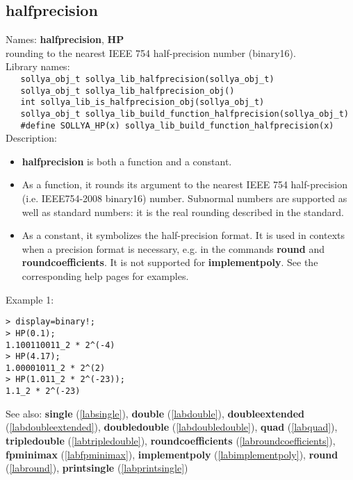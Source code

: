 \subsection{halfprecision}
\label{labhalfprecision}
\noindent Names: \textbf{halfprecision}, \textbf{HP}\\
\phantom{aaa}rounding to the nearest IEEE 754 half-precision number (binary16).\\[0.2cm]
\noindent Library names:\\
\verb|   sollya_obj_t sollya_lib_halfprecision(sollya_obj_t)|\\
\verb|   sollya_obj_t sollya_lib_halfprecision_obj()|\\
\verb|   int sollya_lib_is_halfprecision_obj(sollya_obj_t)|\\
\verb|   sollya_obj_t sollya_lib_build_function_halfprecision(sollya_obj_t)|\\
\verb|   #define SOLLYA_HP(x) sollya_lib_build_function_halfprecision(x)|\\[0.2cm]
\noindent Description: \begin{itemize}

\item \textbf{halfprecision} is both a function and a constant.

\item As a function, it rounds its argument to the nearest IEEE 754 half-precision (i.e. IEEE754-2008 binary16) number.
   Subnormal numbers are supported as well as standard numbers: it is the real
   rounding described in the standard.

\item As a constant, it symbolizes the half-precision format. It is used in 
   contexts when a precision format is necessary, e.g. in the commands 
   \textbf{round} and \textbf{roundcoefficients}. It is not supported for \textbf{implementpoly}.
   See the corresponding help pages for examples.
\end{itemize}
\noindent Example 1: 
\begin{center}\begin{minipage}{15cm}\begin{Verbatim}[frame=single]
> display=binary!;
> HP(0.1);
1.100110011_2 * 2^(-4)
> HP(4.17);
1.00001011_2 * 2^(2)
> HP(1.011_2 * 2^(-23));
1.1_2 * 2^(-23)
\end{Verbatim}
\end{minipage}\end{center}
See also: \textbf{single} (\ref{labsingle}), \textbf{double} (\ref{labdouble}), \textbf{doubleextended} (\ref{labdoubleextended}), \textbf{doubledouble} (\ref{labdoubledouble}), \textbf{quad} (\ref{labquad}), \textbf{tripledouble} (\ref{labtripledouble}), \textbf{roundcoefficients} (\ref{labroundcoefficients}), \textbf{fpminimax} (\ref{labfpminimax}), \textbf{implementpoly} (\ref{labimplementpoly}), \textbf{round} (\ref{labround}), \textbf{printsingle} (\ref{labprintsingle})
